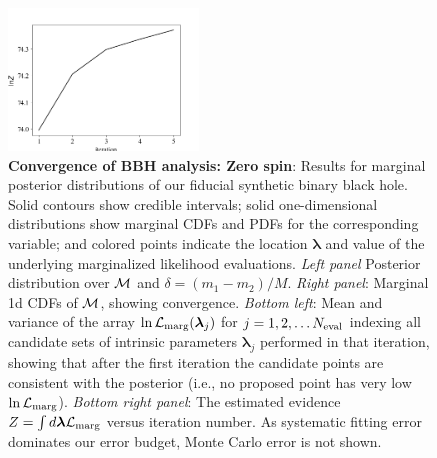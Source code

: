 \documentclass[twocolumn,prd,nofootinbib]{revtex4}
\newcommand\AddedResponse[1]{{\color{blue} {#1}}}
\newcommand\editremark[1]{{\color{red} #1}}
\newcommand{\mc}{{\cal M}}
\begin{document}
\begin{figure}
\includegraphics[width=0.45\textwidth]{figures/bbh_zerospin_lnL_converge.png}
\caption{\label{fig:BBH:MultiIterate}\textbf{Convergence of BBH analysis: Zero spin}: Results for marginal posterior distributions
  of our fiducial synthetic binary black hole.  Solid contours show credible intervals; solid one-dimensional distributions
  show marginal CDFs and PDFs for the corresponding variable; and colored points indicate the location $\bm{\lambda}$ and
  value of the underlying marginalized likelihood evaluations.   
\emph{Left panel } Posterior distribution
  over  $\mc$ and
  $\delta=(m_1-m_2)/M$.    \emph{Right panel}: Marginal 1d CDFs of $\mc$, showing convergence.
\emph{Bottom left}: Mean and variance of  \AddedResponse{the array $\ln{\cal L}_{\rm marg}(\bm{\lambda}_j)$  for
$j=1,2,\ldots N_{\rm eval}$ indexing all candidate sets of intrinsic parameters $\bm{\lambda}_j$ performed in that iteration},  showing that after the
first iteration the
candidate points are consistent with the posterior (i.e., no proposed point has very low $\ln {\cal L}_{\rm marg}$).
\emph{Bottom right panel}: The estimated evidence $Z = \int d\bm{\lambda} {\cal L}_{\rm marg}$ versus iteration number.  As systematic fitting error dominates our
error budget, Monte Carlo error is not shown.
}
\end{figure}
\end{document}
